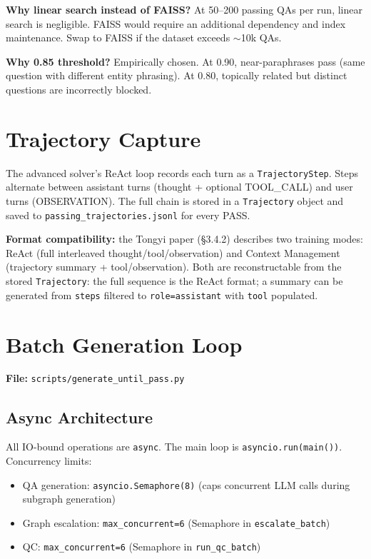 \documentclass[11pt,a4paper]{article}
\begin{document}
\textbf{Why linear search instead of FAISS?} At 50--200 passing QAs per run, linear search is negligible. FAISS would require an additional dependency and index maintenance. Swap to FAISS if the dataset exceeds $\sim$10k QAs.

\textbf{Why 0.85 threshold?} Empirically chosen. At 0.90, near-paraphrases pass (same question with different entity phrasing). At 0.80, topically related but distinct questions are incorrectly blocked.

\section{Trajectory Capture}
\label{sec:trajectory}

The advanced solver's ReAct loop records each turn as a \texttt{TrajectoryStep}. Steps alternate between assistant turns (thought + optional TOOL\_CALL) and user turns (OBSERVATION). The full chain is stored in a \texttt{Trajectory} object and saved to \texttt{passing\_trajectories.jsonl} for every PASS.

\textbf{Format compatibility:} the Tongyi paper (§3.4.2) describes two training modes: ReAct (full interleaved thought/tool/observation) and Context Management (trajectory summary + tool/observation). Both are reconstructable from the stored \texttt{Trajectory}: the full sequence is the ReAct format; a summary can be generated from \texttt{steps} filtered to \texttt{role=assistant} with \texttt{tool} populated.

\section{Batch Generation Loop}
\label{sec:batch}

\textbf{File:} \texttt{scripts/generate\_until\_pass.py}

\subsection{Async Architecture}

All IO-bound operations are \texttt{async}. The main loop is \texttt{asyncio.run(main())}. Concurrency limits:
\begin{itemize}[leftmargin=*,noitemsep]
  \item QA generation: \texttt{asyncio.Semaphore(8)} (caps concurrent LLM calls during subgraph generation)
  \item Graph escalation: \texttt{max\_concurrent=6} (Semaphore in \texttt{escalate\_batch})
  \item QC: \texttt{max\_concurrent=6} (Semaphore in \texttt{run\_qc\_batch})
\end{itemize}
\end{document}
